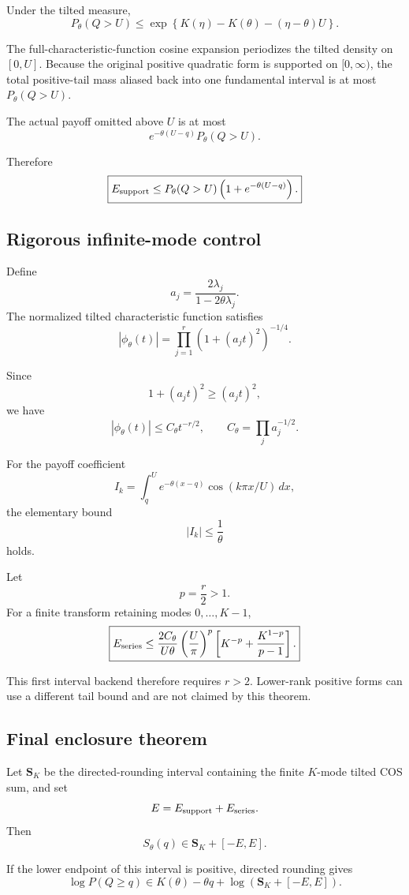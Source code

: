 \documentclass[11pt]{article}
\theoremstyle{definition}
\theoremstyle{remark}
\begin{document}
Under the tilted measure,
\[
P_\theta(Q>U)
\le
\exp\left\{
K(\eta)-K(\theta)-(\eta-\theta)U
\right\}.
\]

The full-characteristic-function cosine expansion periodizes the tilted density
on \([0,U]\).  Because the original positive quadratic form is supported on
\([0,\infty)\), the total positive-tail mass aliased back into one fundamental
interval is at most \(P_\theta(Q>U)\).

The actual payoff omitted above \(U\) is at most
\[
e^{-\theta(U-q)}P_\theta(Q>U).
\]

Therefore
\[
\boxed{
E_{\rm support}
\le
P_\theta(Q>U)
\left(
1+e^{-\theta(U-q)}
\right).
}
\]

\subsection{Rigorous infinite-mode control}

Define
\[
a_j=
\frac{2\lambda_j}{1-2\theta\lambda_j}.
\]
The normalized tilted characteristic function satisfies
\[
|\phi_\theta(t)|
=
\prod_{j=1}^r
\left(
1+(a_jt)^2
\right)^{-1/4}.
\]

Since
\[
1+(a_jt)^2\ge(a_jt)^2,
\]
we have
\[
|\phi_\theta(t)|
\le
C_\theta t^{-r/2},
\qquad
C_\theta=\prod_j a_j^{-1/2}.
\]

For the payoff coefficient
\[
I_k=
\int_q^U
e^{-\theta(x-q)}
\cos(k\pi x/U)\,dx,
\]
the elementary bound
\[
|I_k|\le\frac1\theta
\]
holds.

Let
\[
p=\frac r2>1.
\]
For a finite transform retaining modes \(0,\ldots,K-1\),
\[
\boxed{
E_{\rm series}
\le
\frac{2C_\theta}{U\theta}
\left(\frac{U}{\pi}\right)^p
\left[
K^{-p}
+
\frac{K^{1-p}}{p-1}
\right].
}
\]

This first interval backend therefore requires \(r>2\).  Lower-rank positive
forms can use a different tail bound and are not claimed by this theorem.

\subsection{Final enclosure theorem}

Let \(\boldsymbol S_K\) be the directed-rounding interval containing the finite
\(K\)-mode tilted COS sum, and set
\[
E=E_{\rm support}+E_{\rm series}.
\]
Then
\[
\boxed{
S_\theta(q)
\in
\boldsymbol S_K+[-E,E].
}
\]

If the lower endpoint of this interval is positive, directed rounding gives
\[
\boxed{
\log P(Q\ge q)
\in
K(\theta)-\theta q
+
\log\left(
\boldsymbol S_K+[-E,E]
\right).
}
\]
\end{document}
